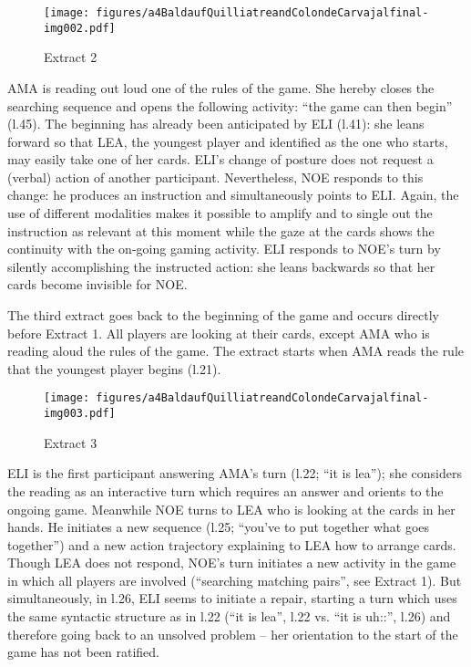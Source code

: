 \documentclass[output=paper]{langscibook}
\begin{document}
\begin{figure}[p]
\caption{Extract 2\label{fig:13:extract2}}
\texttt{[image: figures/a4BaldaufQuilliatreandColondeCarvajalfinal-img002.pdf]}
\end{figure}

AMA is reading out loud one of the rules of the game. She hereby closes the searching sequence and opens the following activity: “the game can then begin” (l.45). The beginning has already been anticipated by ELI (l.41): she leans forward so that LEA, the youngest player and identified as the one who starts, may easily take one of her cards. ELI’s change of posture does not request a (verbal) action of another participant. Nevertheless, NOE responds to this change: he produces an instruction and simultaneously points to ELI. Again, the use of different modalities makes it possible to amplify and to single out the instruction as relevant at this moment while the gaze at the cards shows the continuity with the on-going gaming activity. ELI responds to NOE’s turn by silently accomplishing the instructed action: she leans backwards so that her cards become invisible for NOE.

The third extract goes back to the beginning of the game and occurs directly before Extract 1. All players are looking at their cards, except AMA who is reading aloud the rules of the game. The extract starts when AMA reads the rule that the youngest player begins (l.21). 

\begin{figure}[p]
\caption{Extract 3\label{fig:13:extract3}}
\texttt{[image: figures/a4BaldaufQuilliatreandColondeCarvajalfinal-img003.pdf]}
\end{figure}

 
ELI is the first participant answering AMA’s turn (l.22; “it is lea”); she considers the reading as an interactive turn which requires an answer and orients to the ongoing game. Meanwhile NOE turns to LEA who is looking at the cards in her hands. He initiates a new sequence (l.25; “you've to put together what goes together”) and a new action trajectory explaining to LEA how to arrange cards. Though LEA does not respond, NOE’s turn initiates a new activity in the game in which all players are involved (“searching matching pairs”, see Extract 1). But simultaneously, in l.26, ELI seems to initiate a repair, starting a turn which uses the same syntactic structure as in l.22 (“it is lea”, l.22 vs. “it is uh::”, l.26) and therefore going back to an unsolved problem – her orientation to the start of the game has not been ratified. 
\end{document}

